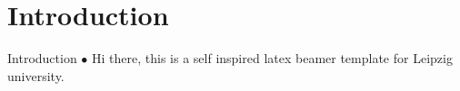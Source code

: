 \section[Intro]{Introduction}
\begin{frame}{Introduction}
$\bullet$ Hi there, this is a self inspired latex beamer template for Leipzig university. 
\end{frame}